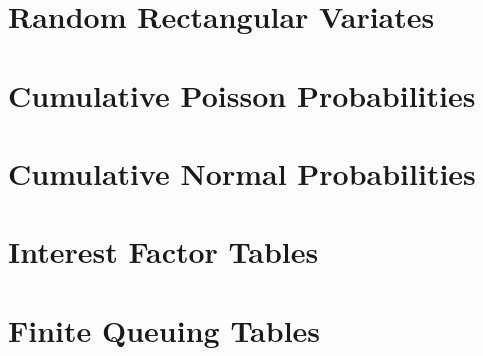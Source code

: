 \section{Random Rectangular Variates}


\section{Cumulative Poisson Probabilities}


\section{Cumulative Normal Probabilities}


\section{Interest Factor Tables}


\section{Finite Queuing Tables}